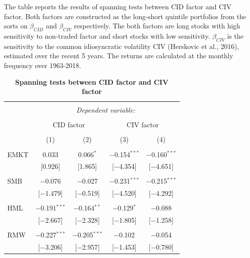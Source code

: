 \documentclass[12pt]{article}
\begin{document}
\begin{table}[!htbp] \centering 
  \caption{\textbf{Spanning tests between CID factor and CIV factor}} 
  \label{} 
  \begin{flushleft}
    {\medskip\small
The table reports the results of spanning tests between CID factor and CIV factor. Both factors are constructed as the long-short quintile portfolios from the sorts on $\beta_{CID}$ and $\beta_{CIV}$ respectively. The both factors are long stocks with high sensitivity to non-traded factor and short stocks with low sensitivity. $\beta_{CIV}$ is the sensitivity to the common idiosyncratic volatility CIV (Herskovic et al., 2016), estimated over the recent 5 years. The returns are calculated at the monthly frequency over 1963-2018.}
    \medskip
    \end{flushleft}
\begin{tabular}{@{\extracolsep{5pt}}lcccc} 
\\[-1.8ex]\hline 
\hline \\[-1.8ex] 
 & \multicolumn{4}{c}{\textit{Dependent variable:}} \\ 
\cline{2-5} 
\\[-1.8ex] & \multicolumn{2}{c}{CID factor} & \multicolumn{2}{c}{CIV factor} \\ 
\\[-1.8ex] & (1) & (2) & (3) & (4)\\ 
\hline \\[-1.8ex] 
 EMKT & 0.033 & 0.066$^{*}$ & $-$0.154$^{***}$ & $-$0.160$^{***}$ \\ 
  & [0.926] & [1.865] & [$-$4.354] & [$-$4.651] \\ 
  & & & & \\ 
 SMB & $-$0.076 & $-$0.027 & $-$0.231$^{***}$ & $-$0.215$^{***}$ \\ 
  & [$-$1.479] & [$-$0.519] & [$-$4.520] & [$-$4.292] \\ 
  & & & & \\ 
 HML & $-$0.191$^{***}$ & $-$0.164$^{**}$ & $-$0.129$^{*}$ & $-$0.088 \\ 
  & [$-$2.667] & [$-$2.328] & [$-$1.805] & [$-$1.258] \\ 
  & & & & \\ 
 RMW & $-$0.227$^{***}$ & $-$0.205$^{***}$ & $-$0.102 & $-$0.054 \\ 
  & [$-$3.206] & [$-$2.957] & [$-$1.453] & [$-$0.780] \\ 

\end{tabular}
\end{table}
\end{document}
